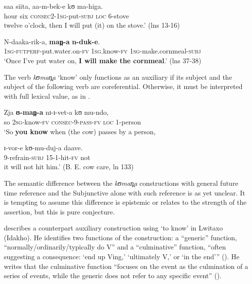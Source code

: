 \documentclass[output=paper]{langsci/langscibook}
\begin{document}
\gll saa   siita,   aa-m-bek-e       kʊ   ma-higa. \\
hour  six  \textsc{consec2-1sg}-put-\textsc{subj}  \textsc{loc}  6-stove \\
\glt twelve o'clock, then I will put (it) on the stove.’ (lns 13-16)
\z 

\ea\label{ex:sarvasy:24}
\gll N-daaka-rik-a,         \textbf{man̪-a}     \textbf{n-duk-e}. \\
\textsc{1sg-futperf}-put.water.on-\textsc{fv}  1\textsc{sg.}know-\textsc{fv}    \textsc{1sg}-make.cornmeal-\textsc{subj} \\
\glt ‘Once I've put water on, \textbf{I will make the cornmeal}.’ (lns 37-38)
\z

The verb \textit{kʊman̪a} ‘know’ only functions as an auxiliary if its subject and the subject of the following verb are coreferential. Otherwise, it must be interpreted with full lexical value, as in .

\ea\label{ex:sarvasy:25}
\gll Zja   \textbf{ʊ-man̪-a}     nɪ-ɪ-vet-a     kʊ     mu-ndo, \\
so  2\textsc{sg-}know\textsc{-fv}  \textsc{consec}-9-\textsc{pass}-\textsc{fv}   \textsc{loc}  1-person \\
\glt ‘So \textbf{you know} when (the cow) passes by a person,

\gll ɪ-vor-e     kʊ-mu-duj-a   daave. \\
9-refrain-\textsc{subj}  15-1-hit-\textsc{fv}  not \\
\glt it will not hit him.’ (B. E. cow care, ln 133)
\z

The semantic difference between the \textit{kʊman̪a} constructions with general future time reference and the Subjunctive alone with such reference is as yet unclear. It is tempting to assume this difference is epistemic or relates to the strength of the assertion, but this is pure conjecture.

\citet{Botne2009} describes a counterpart auxiliary construction using ‘to know’ in Lwitaxo (Idakho). He identifies two functions of the construction: a “generic” function, “normally/ordinarily/typically do V” and a “culminative” function, “often suggesting a consequence: ‘end up Ving,’ ‘ultimately V,’ or ‘in the end’” (\citeyear[93]{Botne2009}). He writes that the culminative function “focuses on the event as the culmination of a series of events, while the generic does not refer to any specific event” (\citeyear[95]{Botne2009}).
\end{document}
